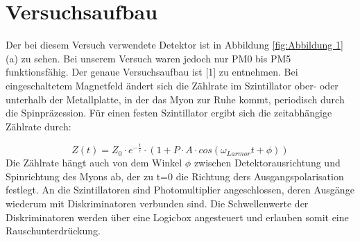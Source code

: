 \section{Versuchsaufbau}
Der bei diesem Versuch verwendete Detektor ist in Abbildung \ref{fig:Abbildung 1} (a) zu sehen. Bei unserem Versuch waren jedoch nur PM0 bis PM5 funktionsfähig. Der genaue Versuchsaufbau ist [1] zu entnehmen. Bei eingeschaltetem Magnetfeld ändert sich die Zählrate im Szintillator ober- oder unterhalb der Metallplatte, in der das Myon zur Ruhe kommt, periodisch durch die Spinpräzession. Für einen festen Szintillator ergibt sich die zeitabhängige Zählrate durch:

\begin{equation}
	Z(t) = Z_0 \cdot e^{-\frac{t}{\tau}} \cdot \left(
	1 + P\cdot A \cdot
	cos\left(\omega _{Larmor} t+\phi \right)
	\right)
\end{equation}
Die Zählrate hängt auch von dem Winkel $\phi$ zwischen Detektorausrichtung und Spinrichtung des Myons ab, der zu t=0 die Richtung ders Ausgangspolarisation festlegt. An die Szintillatoren sind Photomultiplier angeschlossen, deren Ausgänge wiederum mit Diskriminatoren verbunden sind. Die Schwellenwerte der Diskriminatoren werden über eine Logicbox angesteuert und erlauben somit eine Rauschunterdrückung.
